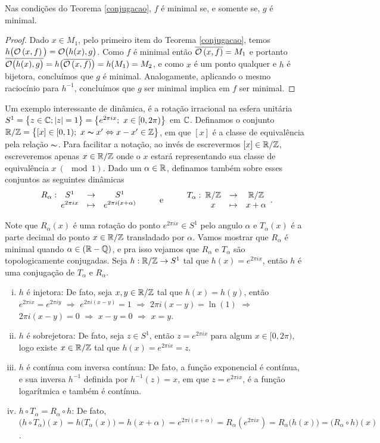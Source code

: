 \begin{corolario}\label{conjminimal} Nas condições do Teorema \ref{conjugacao}, $f$ é minimal se, e somente se, $g$ é minimal.
\end{corolario}

\begin{proof} Dado $x\in M_1$, pelo primeiro item do Teorema \ref{conjugacao}, temos $h\big(\mathcal{O}\left(x,f\right)\big)=\mathcal{O}\big(h(x),g\big)$. Como $f$ é minimal então $\overline{\mathcal{O}\left(x,f\right)}=M_1$ e portanto $\overline{\mathcal{O}\big(h(x),g\big)}=h\big(\overline{\mathcal{O}\left(x,f\right)}\big)=h(M_1)=M_2$, e como $x$ é um ponto qualquer e $h$ é bijetora, concluímos que $g$ é minimal. Analogamente, aplicando o mesmo raciocínio para $h^{-1}$, concluímos que $g$ ser minimal implica em $f$ ser minimal.
\end{proof}

Um exemplo interessante de dinâmica, é a rotação irracional na esfera unitária $S^1=\big\{z\in\C;|z|=1\big\}=\big\{e^{2\pi ix};\ x\in[0,2\pi)\big\}$ em $\mathbb{C}$. Definamos o conjunto $\mathbb{R}/\mathbb{Z}=\big\{[x]\in [0,1);\ x\thicksim x'\Leftrightarrow x-x'\in\mathbb{Z}\big\}$, em que $[x]$ é a classe de equivalência pela relação $\thicksim$. Para facilitar a notação, ao invés de escrevermos $[x]\in\mathbb{R}/\mathbb{Z}$, escreveremos apenas $x\in\mathbb{R}/\mathbb{Z}$ onde o $x$ estará representando sua classe de equivalência $x\ (\mod 1)$. Dado um $\alpha\in\mathbb{R}$, definamos também sobre esses conjuntos as seguintes dinâmicas
\begin{equation*}
\funcao{R_{\alpha}}{S^1}{S^1}{e^{2\pi ix}}{e^{2\pi i(x+\alpha)}}\qquad\text{ e }\qquad \funcao{T_{\alpha}}{\R/\Z}{\R/\Z}{x}{x+\alpha}.
\end{equation*}

Note que $R_{\alpha}(x)$ é uma rotação do ponto $e^{2\pi ix}\in S^1$ pelo angulo $\alpha$ e $T_{\alpha}(x)$ é a parte decimal do ponto $x\in\mathbb{R}/\mathbb{Z}$ transladado por $\alpha$. Vamos mostrar que $R_\alpha$ é minimal quando $\alpha\in(\mathbb{R}-\mathbb{Q})$, e pra isso vejamos que $R_\alpha$ e $T_\alpha$ são topologicamente conjugadas. Seja $h:\mathbb{R}/\mathbb{Z}\to S^1$ tal que $h(x)=e^{2\pi ix}$, então $h$ é uma conjugação de $T_{\alpha}$ e $R_{\alpha}$. 

\begin{enumerate}[i)]
\item $h$ é injetora: De fato, seja $x,y\in \mathbb{R}/\mathbb{Z}$ tal que $h(x)=h(y)$, então $e^{2\pi ix}=e^{2\pi iy}$ $\Rightarrow$ $e^{2\pi i(x-y)}=1$ $\Rightarrow$ $2\pi i(x-y)=\ln(1)$ $\Rightarrow$ $2\pi i(x-y)=0$ $\Rightarrow$ $x-y=0$ $\Rightarrow$ $x=y$.
\item $h$ é sobrejetora: De fato, seja $z\in S^1$, então $z=e^{2\pi ix}$ para algum $x\in[0,2\pi)$, logo existe $x\in\mathbb{R}/\mathbb{Z}$ tal que $h(x)=e^{2\pi ix}=z$.
\item $h$ é contínua com inversa contínua: De fato, a função exponencial é contínua, e sua inversa $h^{-1}$ definida por $h^{-1}(z)=x$, em que $z=e^{2\pi ix}$, é a função logarítmica e também é contínua.
\item $h\circ T_{\alpha}=R_{\alpha}\circ h$: De fato, $\big(h\circ T_{\alpha}\big)(x)=h\big(T_{\alpha}(x)\big)=h(x+\alpha)=e^{2\pi i(x+\alpha)}=R_{\alpha}(e^{2\pi ix})=R_{\alpha}\big(h(x)\big)=\big(R_{\alpha}\circ h\big)(x)$.
\end{enumerate}

